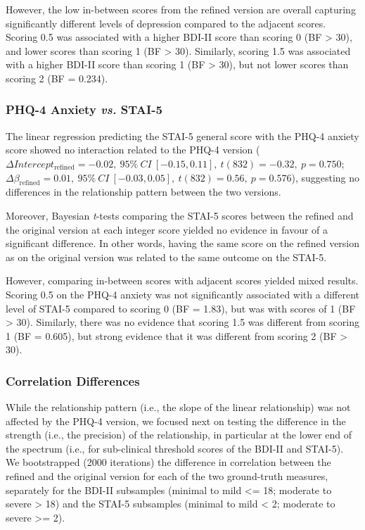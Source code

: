 \documentclass[
  jou,
  floatsintext,
  longtable,
  nolmodern,
  notxfonts,
  notimes,
  colorlinks=true,linkcolor=blue,citecolor=blue,urlcolor=blue]{apa7}
\begin{document}
However, the low in-between scores from the refined version are overall
capturing significantly different levels of depression compared to the
adjacent scores. Scoring 0.5 was associated with a higher BDI-II score
than scoring 0 (BF \textgreater{} 30), and lower scores than scoring 1
(BF \textgreater{} 30). Similarly, scoring 1.5 was associated with a
higher BDI-II score than scoring 1 (BF \textgreater{} 30), but not lower
scores than scoring 2 (BF = 0.234).

\subsubsection{\texorpdfstring{PHQ-4 Anxiety \emph{vs.}
STAI-5}{PHQ-4 Anxiety vs. STAI-5}}\label{phq-4-anxiety-vs.-stai-5}

The linear regression predicting the STAI-5 general score with the PHQ-4
anxiety score showed no interaction related to the PHQ-4 version
(\(\Delta Intercept_{\text{refined}} =  -0.02,~95\%~CI~[-0.15, 0.11],~t(832) =  -0.32,~p = 0.750\);
\(\Delta \beta_{\text{refined}} = 0.01,~95\%~CI~[-0.03, 0.05],~t(832) = 0.56,~p = 0.576\)),
suggesting no differences in the relationship pattern between the two
versions.

Moreover, Bayesian \emph{t}-tests comparing the STAI-5 scores between
the refined and the original version at each integer score yielded no
evidence in favour of a significant difference. In other words, having
the same score on the refined version as on the original version was
related to the same outcome on the STAI-5.

However, comparing in-between scores with adjacent scores yielded mixed
results. Scoring 0.5 on the PHQ-4 anxiety was not significantly
associated with a different level of STAI-5 compared to scoring 0 (BF =
1.83), but was with scores of 1 (BF \textgreater{} 30). Similarly, there
was no evidence that scoring 1.5 was different from scoring 1 (BF =
0.605), but strong evidence that it was different from scoring 2 (BF
\textgreater{} 30).

\subsubsection{Correlation Differences}\label{correlation-differences}

While the relationship pattern (i.e., the slope of the linear
relationship) was not affected by the PHQ-4 version, we focused next on
testing the difference in the strength (i.e., the precision) of the
relationship, in particular at the lower end of the spectrum (i.e., for
sub-clinical threshold scores of the BDI-II and STAI-5). We bootstrapped
(2000 iterations) the difference in correlation between the refined and
the original version for each of the two ground-truth measures,
separately for the BDI-II subsamples (minimal to mild \textless= 18;
moderate to severe \textgreater{} 18) and the STAI-5 subsamples (minimal
to mild \textless{} 2; moderate to severe \textgreater= 2).
\end{document}
